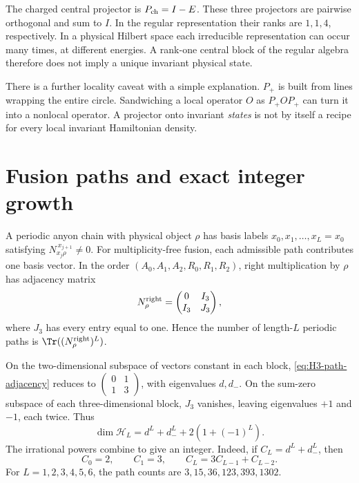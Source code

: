 The charged central projector is $P_{\rm ch}=I-E$.  These three
projectors are pairwise orthogonal and sum to $I$.  In the regular
representation their ranks are $1,1,4$, respectively.  In a physical
Hilbert space each irreducible representation can occur many times,
at different energies.  A rank-one central block of the regular
algebra therefore does not imply a unique invariant physical state.

There is a further locality caveat with a simple explanation.
$P_+$ is built from lines wrapping the entire circle.  Sandwiching
a local operator $O$ as $P_+OP_+$ can turn it into a nonlocal
operator.  A projector onto invariant \emph{states} is not by itself
a recipe for every local invariant Hamiltonian density.

\section{Fusion paths and exact integer growth}

A periodic anyon chain with physical object $\rho$ has basis labels
$x_0,x_1,\ldots,x_L=x_0$ satisfying
$N_{x_j\rho}^{\ x_{j+1}}\ne0$.  For multiplicity-free fusion,
each admissible path contributes one basis vector.  In the order
$(A_0,A_1,A_2,R_0,R_1,R_2)$, right multiplication by $\rho$ has
adjacency matrix
\begin{equation}
 N_\rho^{\rm right}=
 \begin{pmatrix}0&I_3\\I_3&J_3\end{pmatrix},
 \label{eq:H3-path-adjacency}
\end{equation}
where $J_3$ has every entry equal to one.  Hence the number of
length-$L$ periodic paths is $\Tr((N_\rho^{\rm right})^L)$.

On the two-dimensional subspace of vectors constant in each block,
\eqref{eq:H3-path-adjacency} reduces to
$\left(\begin{smallmatrix}0&1\\1&3\end{smallmatrix}\right)$,
with eigenvalues $d,d_-$.  On the sum-zero subspace of each
three-dimensional block, $J_3$ vanishes, leaving eigenvalues $+1$
and $-1$, each twice.  Thus
\begin{equation}
 \dim\mathscr H_L=d^L+d_-^L+2(1+(-1)^L).
 \label{eq:H3-path-count}
\end{equation}
The irrational powers combine to give an integer.  Indeed, if
$C_L=d^L+d_-^L$, then
\begin{equation}
 C_0=2,\qquad C_1=3,\qquad C_L=3C_{L-1}+C_{L-2}.
 \label{eq:H3-path-recurrence}
\end{equation}
For $L=1,2,3,4,5,6$, the path counts are
$3,15,36,123,393,1302$.

